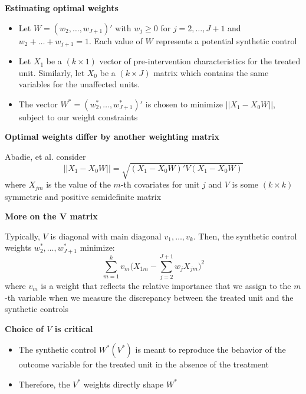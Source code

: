 \documentclass[notes=show]{beamer}
\begin{document}
\begin{frame}[plain]
	\begin{center}
	\textbf{Estimating optimal weights}
	\end{center}
	
	\begin{itemize}
	\item Let $W=(w_2, \dots, w_{J+1})'$ with $w_j\geq 0$ for $j=2, \dots, J+1$ and $w_2+\dots+w_{j+1}=1$. Each value of $W$ represents a potential synthetic control
	\item Let $X_1$ be a $(k\times 1)$ vector of pre-intervention characteristics for the treated unit.  Similarly, let $X_0$ be a $(k\times J)$ matrix which contains the same variables for the unaffected units.
	\item The vector $W^*=(w_2^*, \dots, w_{J+1}^*)'$ is chosen to minimize $||X_1-X_0W||$, subject to our weight constraints
	\end{itemize}
\end{frame}

\begin{frame}[plain]
	\begin{center}
	\textbf{Optimal weights differ by another weighting matrix}
	\end{center}
	
Abadie, et al. consider $$||X_1 - X_0W||=\sqrt{(X_1-X_0W)'V(X_1-X_0W)}$$where $X_{jm}$ is the value of the $m$-th covariates for unit $j$ and $V$ is some $(k\times k)$ symmetric and positive semidefinite matrix

\end{frame}

\begin{frame}[plain]

\begin{center}
\textbf{More on the V matrix}
\end{center}

Typically, $V$ is diagonal with main diagonal $v_1, \dots, v_k$.  Then, the synthetic control weights $w_2^*, \dots, w_{J+1}^*$ minimize: $$\sum_{m=1}^k v_m \bigg(X_{1m} - \sum_{j=2}^{J+1}w_jX_{jm}\bigg)^2$$ where $v_m$ is a weight that reflects the relative importance that we assign to the $m$-th variable when we measure the discrepancy between the treated unit and the synthetic controls

\end{frame}

\begin{frame}[plain]
	\begin{center}
	\textbf{Choice of $V$ is critical}
	\end{center}
	
		\begin{itemize}
		\item The synthetic control $W^*(V^*)$ is meant to reproduce the behavior of the outcome variable for the treated unit in the absence of the treatment
		\item Therefore, the $V^*$ weights directly shape $W^*$
		\end{itemize}
\end{frame}
\end{document}
